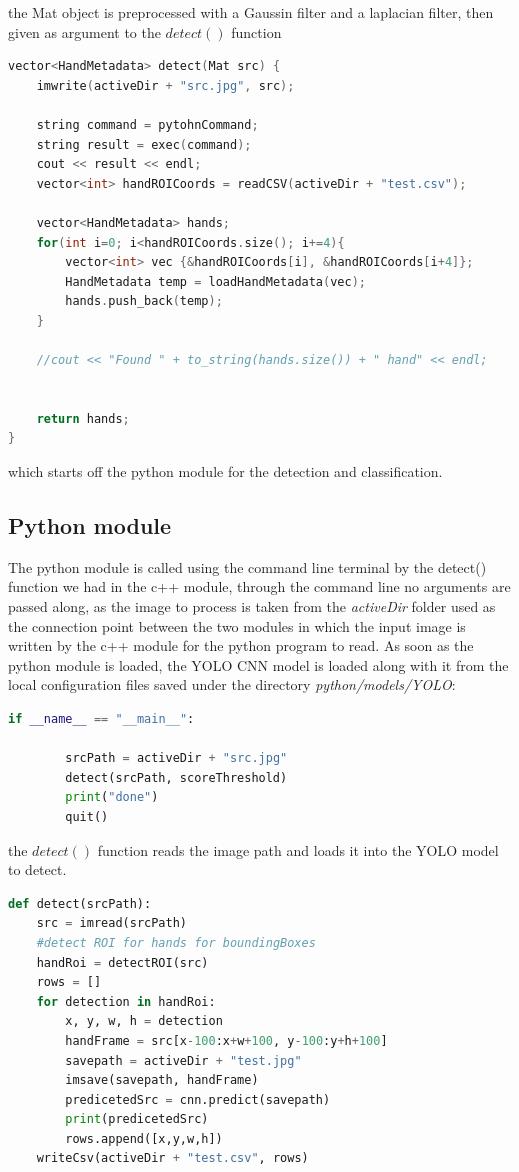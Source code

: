 the Mat object is preprocessed with a Gaussin filter and a laplacian filter,
then given as argument to the $detect()$ function

\begin{lstlisting}[language = c++]
    vector<HandMetadata> detect(Mat src) {
    imwrite(activeDir + "src.jpg", src);

    string command = pytohnCommand;
    string result = exec(command);
    cout << result << endl;
    vector<int> handROICoords = readCSV(activeDir + "test.csv");

    vector<HandMetadata> hands;
    for(int i=0; i<handROICoords.size(); i+=4){
        vector<int> vec {&handROICoords[i], &handROICoords[i+4]};
        HandMetadata temp = loadHandMetadata(vec);
        hands.push_back(temp);
    }
    
    //cout << "Found " + to_string(hands.size()) + " hand" << endl;
    
    
    return hands;
}
\end{lstlisting}

which starts off the python module for the detection and classification.

\subsection{Python module}
The python module is called using the command line terminal by the detect()
function we had in the c++ module, through the command line no arguments are
passed along,
as the image to process is taken from the \textit{activeDir} folder used as the
connection point between the two modules in which the input image is written by
the
c++ module for the python program to read. As soon as the python module is
loaded, the YOLO CNN model is loaded along with it from the local configuration
files
saved under the directory \textit{python/models/YOLO}:

\begin{lstlisting}[language=python]
    if __name__ == "__main__":

        srcPath = activeDir + "src.jpg"
        detect(srcPath, scoreThreshold)
        print("done")
        quit()
\end{lstlisting}

the $detect()$ function reads the image path and loads it into the YOLO model
to detect.

\begin{lstlisting}[language=python]
    def detect(srcPath):
    src = imread(srcPath)
    #detect ROI for hands for boundingBoxes
    handRoi = detectROI(src)
    rows = []
    for detection in handRoi:
        x, y, w, h = detection
        handFrame = src[x-100:x+w+100, y-100:y+h+100]
        savepath = activeDir + "test.jpg"
        imsave(savepath, handFrame)
        predicetedSrc = cnn.predict(savepath)
        print(predicetedSrc)
        rows.append([x,y,w,h])
    writeCsv(activeDir + "test.csv", rows)
\end{lstlisting}

